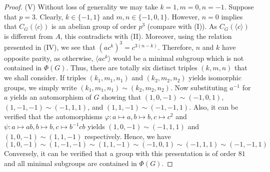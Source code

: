 \documentclass[a4paper,12pt]{article}
\theoremstyle{definition}
\theoremstyle{remark}
\theoremstyle{theorem}
\begin{document}
\begin{proof}
  (V) Without loss of generality we may take $k=1, m=0, n=-1$. Suppose
  that $p=3$. Clearly, $k\in\{-1,1\}$ and $m,n\in\{-1,0,1\}$. However,
  $n=0$ implies that $C_G(\langle c\rangle)$ is an abelian
  group of order $p^3$ (compare with (I)). As
  $C_G(\langle c\rangle)$ is different from $A$, this
  contradicts with (II). Moreover, using the relation presented in
  (IV), we see that $(ac^k)^3=c^{3(n-k)}$. Therefore, $n$ and $k$ have
  opposite parity, as otherwise, $\langle ac^k\rangle$ would be a
  minimal subgroup which is not contained in $\Phi(G)$. Thus, there
  are totally six distinct triples $(k,m,n)$ that we shall
  consider. If triples $(k_1,m_1,n_1)$ and $(k_2,m_2,n_2)$ yields
  isomorphic groups, we simply write
  $(k_1,m_1,n_1)\sim(k_2,m_2,n_2)$. Now substituting $a^{-1}$ for $a$
  yields an automorphism of $G$ showing that $(1,0,-1)\sim(-1,0,1)$,\,
  $(1,-1,-1)\sim(-1,1,1)$, and $(1,1,-1)\sim(-1,-1,1)$. Also, it can
  be verified that the automorphisms
  $\varphi\colon a\mapsto a, b\mapsto b, c\mapsto c^2$ and
  $\psi\colon a\mapsto ab, b\mapsto b, c\mapsto b^{-1}cb$ yields
  $(1,0,-1)\sim(-1,1,1)$ and $(1,0,-1)\sim(1,1,-1)$
  respectively. Hence, we have
  $$
  (1,0,-1)\sim(1,-1,-1)\sim(1,1,-1)\sim(-1,0,1)\sim(-1,1,1)\sim(-1,-1,1) $$
  Conversely, it can be verified that a group with this presentation
  is of order $81$ and all minimal subgroups are contained in
  $\Phi(G)$. 




\end{proof}
\end{document}
